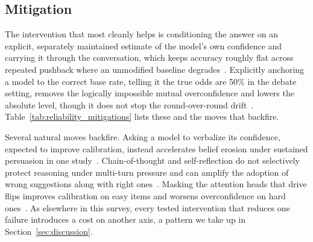 \subsection{Mitigation}
\label{sec:calibration_failure_mitigation}

The intervention that most cleanly helps is conditioning the answer on an explicit, separately maintained estimate of the model's own confidence and carrying it through the conversation, which keeps accuracy roughly flat across repeated pushback where an unmodified baseline degrades~\citep{FirmOrFickleEvaluating_Li}. Explicitly anchoring a model to the correct base rate, telling it the true odds are 50\% in the debate setting, removes the logically impossible mutual overconfidence and lowers the absolute level, though it does not stop the round-over-round drift~\citep{WhenTwoLLMsDebate_Prasad}. Table~\ref{tab:reliability_mitigations} lists these and the moves that backfire.

Several natural moves backfire. Asking a model to verbalize its confidence, expected to improve calibration, instead accelerates belief erosion under sustained persuasion in one study~\citep{VulnerabilityOfLLMsStated_Huang}. Chain-of-thought and self-reflection do not selectively protect reasoning under multi-turn pressure and can amplify the adoption of wrong suggestions along with right ones~\citep{StopListeningToMe_Guo, EasierToMisleadThan_Qu}. Masking the attention heads that drive flips improves calibration on easy items and worsens overconfidence on hard ones~\citep{InterpretingAndMitigatingUnwanted_Roy}. As elsewhere in this survey, every tested intervention that reduces one failure introduces a cost on another axis, a pattern we take up in Section~\ref{sec:discussion}.

\begin{table}[htbp]
\centering
\footnotesize
\setlength{\tabcolsep}{4pt}
\renewcommand{\arraystretch}{1.3}
\caption{Mitigations tested against reliability failure, ordered as in the text.}
\label{tab:reliability_mitigations}
\end{table}
